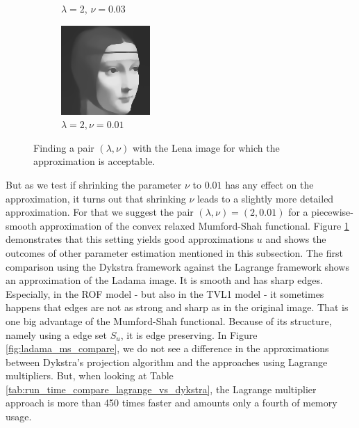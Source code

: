 \documentclass[abstracton]{scrreprt}
\begin{document}
\begin{figure}[!ht]
\begin{subfigure}[b]{0.24\textwidth}
                    \caption{$\lambda = 2$, $\nu = 0.03$}
                \end{subfigure}
                \begin{subfigure}[b]{0.24\textwidth}
                    \includegraphics[width=\textwidth]{img/approximation/01ladama001.png}
                    \caption{$\lambda = 2, \nu = 0.01$}
                \end{subfigure}
                \caption[Parameter estimation for the convex relaxed Mumford-Shah functional.]{Finding a pair $(\lambda, \nu)$ with the Lena image for which the approximation is acceptable.}
            \label{fig:best_parameter_estimation_cr}
            \end{figure}
            But as we test if shrinking the parameter $\nu$ to $0.01$ has any effect on the approximation, it turns out that shrinking $\nu$ leads to a slightly more detailed approximation. For that we suggest the pair $(\lambda, \nu) = (2, 0.01)$ for a piecewise-smooth approximation of the convex relaxed Mumford-Shah functional. Figure \ref{fig:best_parameter_estimation_cr} demonstrates that this setting yields good approximations $u$ and shows the outcomes of other parameter estimation mentioned in this subsection. The first comparison using the Dykstra framework against the Lagrange framework shows an approximation of the Ladama image. It is smooth and has sharp edges. Especially, in the ROF model - but also in the TVL1 model - it sometimes happens that edges are not as strong and sharp as in the original image. That is one big advantage of the Mumford-Shah functional. Because of its structure, namely using a edge set $S_{u}$, it is edge preserving. In Figure \ref{fig:ladama_ms_compare}, we do not see a difference in the approximations between Dykstra's projection algorithm and the approaches using Lagrange multipliers. But, when looking at Table \ref{tab:run_time_compare_lagrange_vs_dykstra}, the Lagrange multiplier approach is more than 450 times faster and amounts only a fourth of memory usage.
\end{document}
